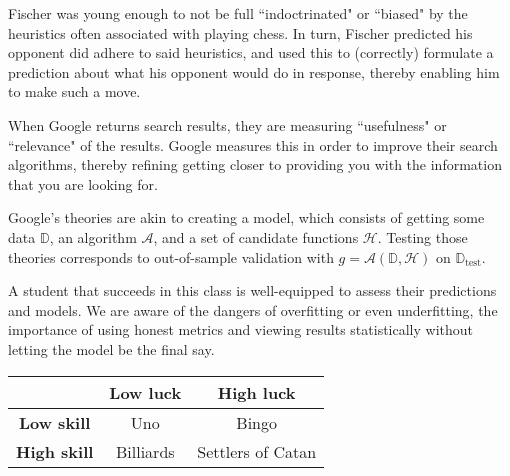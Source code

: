 \documentclass[12pt]{article}
\begin{document}
\begin{enumerate}
Fischer was young enough to not be full ``indoctrinated" or ``biased" by the
heuristics often associated with playing chess. In turn, Fischer predicted
his opponent did adhere to said heuristics, and used this to (correctly) formulate
a prediction about what his opponent would do in response, thereby enabling
him to make such a move.


When Google returns search results, they are measuring ``usefulness"
or ``relevance" of the results. Google measures this in order to improve
their search algorithms, thereby refining getting closer to providing you
with the information that you are looking for.


Google's theories are akin to creating a model, which consists of getting some
data $\mathbb{D}$, an algorithm $\mathcal{A}$, and a set of candidate functions
$\mathcal{H}$. Testing those theories corresponds to out-of-sample validation with
$g = \mathcal{A}(\mathbb{D}, \mathcal{H})$ on $\mathbb{D}_{\text{test}}$.


A student that succeeds in this class is well-equipped to assess their predictions
and models. We are aware of the dangers of overfitting or even underfitting,
the importance of using honest metrics and viewing results statistically
without letting the model be the final say.


\begin{center}
	\begin{tabular}{|c|c|c|}
		\hline
		{} & \textbf{Low luck} & \textbf{High luck} \\
		\hline
		\textbf{Low skill} & Uno & Bingo\\
		\hline
		\textbf{High skill} & Billiards & Settlers of Catan \\
		\hline
	\end{tabular}
\end{center}


\end{enumerate}
\end{document}
